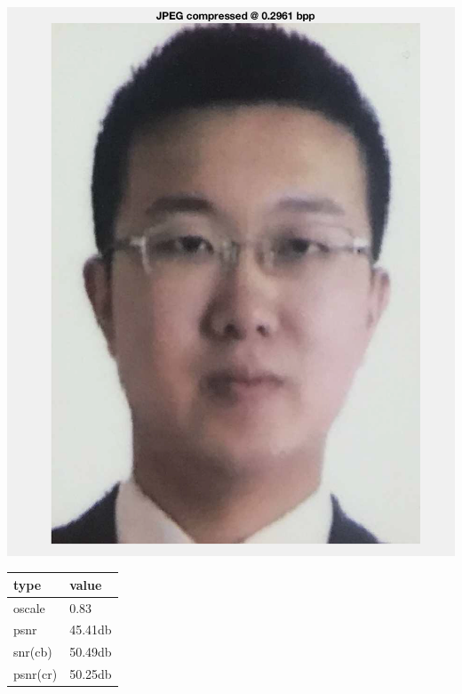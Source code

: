 \documentclass[titlepage]{article}
\begin{document}
\begin{center}
\includegraphics[width=.9\linewidth]{./img/p3_83.png}
\end{center}

\begin{center}
\begin{tabular}{ll}
type & value\\
\hline
oscale & 0.83\\
psnr & 45.41db\\
snr(cb) & 50.49db\\
psnr(cr) & 50.25db\\
\end{tabular}
\end{center}
\end{document}

